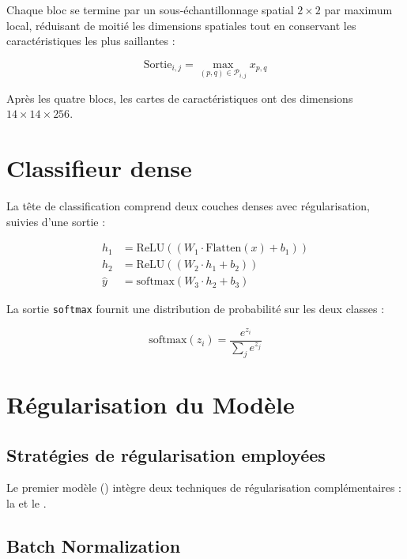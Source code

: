Chaque bloc se termine par un sous-échantillonnage spatial $2 \times 2$ par
maximum local, réduisant de moitié les dimensions spatiales tout en conservant
les caractéristiques les plus saillantes :

\begin{equation}
\text{Sortie}_{i,j} = \max_{(p,q) \in \mathcal{P}_{i,j}} x_{p,q}
\end{equation}

Après les quatre blocs, les cartes de caractéristiques ont des dimensions
$14 \times 14 \times 256$.

\section{Classifieur dense}

La tête de classification comprend deux couches denses avec régularisation,
suivies d'une sortie  :

\begin{align}
h_1 &= \text{ReLU}(\text{}(W_1 \cdot \text{Flatten}(x) + b_1)) \\
h_2 &= \text{ReLU}(\text{}(W_2 \cdot h_1 + b_2)) \\
\hat{y} &= \text{softmax}(W_3 \cdot h_2 + b_3)
\end{align}

La sortie \texttt{softmax} fournit une distribution de probabilité sur les
deux classes :

\begin{equation}
\text{softmax}(z_i) = \frac{e^{z_i}}{\sum_{j} e^{z_j}}
\end{equation}


\section{Régularisation du Modèle}

\subsection{Stratégies de régularisation employées}

Le premier modèle () intègre deux techniques de régularisation
complémentaires : la  et le .

\subsection{Batch Normalization}

